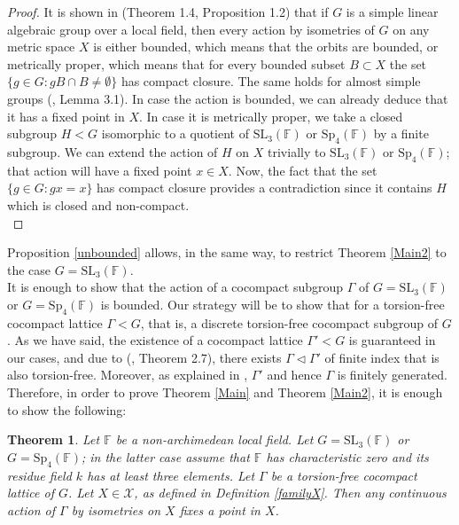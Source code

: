 \documentclass{article}
\theoremstyle{definition}
\theoremstyle{remark}
\theoremstyle{plain}
\newtheorem{thm}[dfn]{Theorem}
\begin{document}
\begin{proof}
    It is shown in \cite{cornulier} (Theorem 1.4, Proposition 1.2) that if $G$ is a simple linear algebraic group over a local field, then every action by isometries of $G$ on any metric space $X$ is either bounded, which means that the orbits are bounded, or metrically proper, which means that for every bounded subset $B\subset X$ the set $\{g\in G: gB\cap B\neq\emptyset\}$ has compact closure. The same holds for almost simple groups (\cite{cornulier}, Lemma 3.1). In case the action is bounded, we can already deduce that it has a fixed point in $X$. In case it is metrically proper, we take a closed subgroup $H<G$ isomorphic to a quotient of $\mathrm{SL}_3(\mathbb{F})$ or $\mathrm{Sp}_4(\mathbb{F})$ by a finite subgroup. We can extend the action of $H$ on $X$ trivially to $\mathrm{SL}_3(\mathbb{F})$ or $\mathrm{Sp}_4(\mathbb{F})$; that action will have a fixed point $x\in X$. Now, the fact that the set $\{g\in G: gx=x\}$ has compact closure provides a contradiction since it contains $H$ which is closed and non-compact. \\
\end{proof}

Proposition \ref{unbounded} allows, in the same way, to restrict Theorem \ref{Main2} to the case $G=\mathrm{SL}_3(\mathbb{F})$. \\

It is enough to show that the action of a cocompact subgroup $\Gamma$ of $G=\mathrm{SL}_3(\mathbb{F})$ or $G=\mathrm{Sp}_4(\mathbb{F})$ is bounded. Our strategy will be to show that for a torsion-free cocompact lattice $\Gamma<G$, that is, a discrete torsion-free cocompact subgroup of $G$. As we have said, the existence of a cocompact lattice $\Gamma'<G$ is guaranteed in our cases, and due to (\cite{garland}, Theorem 2.7), there exists $\Gamma\lhd\Gamma'$ of finite index that is also torsion-free. Moreover, as explained in \cite{garland}, $\Gamma'$ and hence $\Gamma$ is finitely generated. \\

Therefore, in order to prove Theorem \ref{Main} and Theorem \ref{Main2}, it is enough to show the following:

\begin{thm} \label{main}
    Let $\mathbb{F}$ be a non-archimedean local field. Let $G=\mathrm{SL}_3(\mathbb{F})$ or $G=\mathrm{Sp}_4(\mathbb{F})$; in the latter case assume that $\mathbb{F}$ has characteristic zero and its residue field $k$ has at least three elements. Let $\Gamma$ be a torsion-free cocompact lattice of $G$. Let $X\in\mathcal{X}$, as defined in Definition \ref{familyX}. Then any continuous action of $\Gamma$ by isometries on $X$ fixes a point in $X$. \\
\end{thm}
\end{document}
